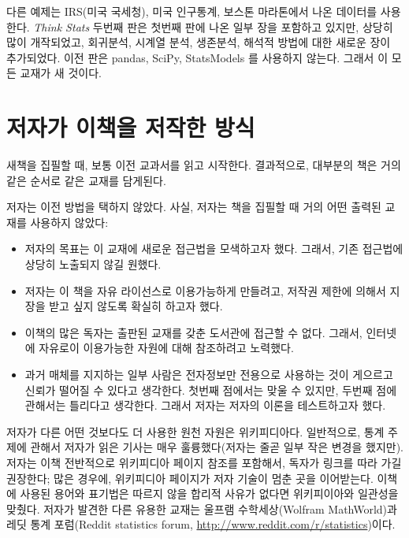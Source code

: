 다른 예제는 IRS(미국 국세청), 미국 인구통계, 보스톤 마라톤에서 나온 데이터를 사용한다.
{\it Think Stats} 두번째 판은 첫번째 판에 나온 일부 장을 포함하고 있지만, 상당히 많이 개작되었고, 회귀분석, 시계열 분석, 생존분석, 해석적 방법에 대한 새로운 장이 추가되었다.
이전 판은 pandas, SciPy, StatsModels 를 사용하지 않는다. 그래서 이 모든 교재가 새 것이다.

\section{저자가 이책을 저작한 방식}

새책을 집필할 때, 보통 이전 교과서를 읽고 시작한다. 결과적으로, 대부분의 책은 거의 같은 순서로 같은 교재를 담게된다.

저자는 이전 방법을 택하지 않았다. 사실, 저자는 책을 집필할 때 거의 어떤 출력된 교재를 사용하지 않았다:

\begin{itemize}

\item 저자의 목표는 이 교재에 새로운 접근법을 모색하고자 했다. 그래서, 기존 접근법에 상당히 노출되지 않길 원했다.

\item 저자는 이 책을 자유 라이선스로 이용가능하게 만들려고, 저작권 제한에 의해서 지장을 받고 싶지 않도록 확실히 하고자 했다.

\item 이책의 많은 독자는 출판된 교재를 갖춘 도서관에 접근할 수 없다. 그래서, 인터넷에 자유로이 이용가능한 자원에 대해 참조하려고 노력했다.

\item 과거 매체를 지지하는 일부 사람은 전자정보만 전용으로 사용하는 것이 게으르고 신뢰가 떨어질 수 있다고 생각한다. 첫번째 점에서는 맞울 수 있지만, 두번째 점에 관해서는 틀리다고 생각한다.
그래서 저자는 저자의 이론을 테스트하고자 했다.


\end{itemize}

저자가 다른 어떤 것보다도 더 사용한 원천 자원은 위키피디아다. 일반적으로,
통계 주제에 관해서 저자가 읽은 기사는 매우 훌륭했다(저자는 줄곧 일부 작은 변경을 했지만).
저자는 이책 전반적으로 위키피디아 페이지 참조를 포함해서, 독자가 링크를 따라 가길 권장한다; 많은 경우에,
위키피디아 페이지가 저자 기술이 멈춘 곳을 이어받는다. 이책에 사용된 용어와 표기법은 따르지 않을 합리적 사유가 없다면 위키피이아와 일관성을 맞췄다.
저자가 발견한 다른 유용한 교재는 울프램 수학세상(Wolfram MathWorld)과 레딧 통계 포럼(Reddit statistics forum, \url{http://www.reddit.com/r/statistics})이다.

